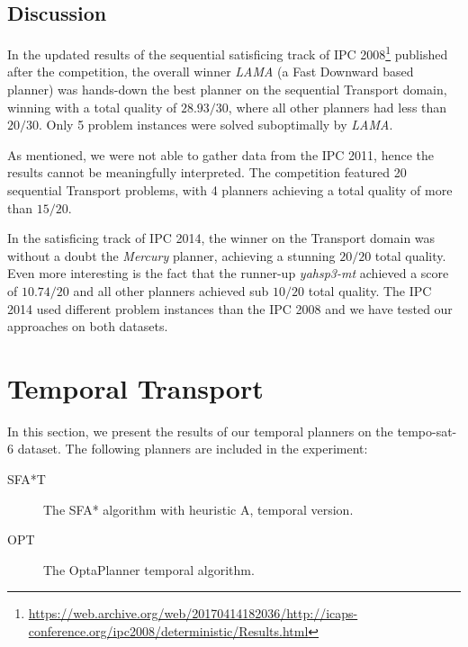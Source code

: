 \subsection{Discussion}

In the updated results of the sequential satisficing track of IPC 2008\footnote{\url{https://web.archive.org/web/20170414182036/http://icaps-conference.org/ipc2008/deterministic/Results.html}} published after the competition,
the overall winner \textit{LAMA} (a Fast Downward based planner)
was hands-down the best planner on the sequential Transport domain, winning
with a total quality of $28.93/30$, where all other planners had less than $20/30$.
Only 5 problem instances were solved suboptimally by \textit{LAMA}.

As mentioned, we were not able to gather data from the IPC 2011,
hence the results cannot be meaningfully interpreted.
The competition featured 20 sequential Transport problems,
with 4 planners achieving a total quality of more than $15/20$.

In the satisficing track of IPC 2014, the winner on the Transport domain
was without a doubt the \textit{Mercury} planner, achieving
a stunning $20/20$ total quality. Even more interesting is the fact that
the runner-up \textit{yahsp3-mt} achieved a score of $10.74/20$
and all other planners achieved sub $10/20$ total quality.
The IPC 2014 used different problem instances than the IPC 2008
and we have tested our approaches on both datasets.















\section{Temporal Transport}

In this section, we present the results of our temporal planners on the tempo-sat-6 dataset. The following planners are included in the experiment:
\begin{description}
\item[SFA*T] The SFA* algorithm with heuristic A, temporal version. 
\item[OPT] The OptaPlanner temporal algorithm. 
\end{description}

